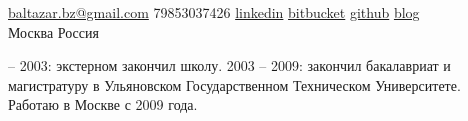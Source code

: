 \documentclass[unicode, 10pt, a4paper, oneside, fleqn]{article}
\begin{document}
\sloppy  %


\nobreakvspace{0.3em}  %

\noindent\href{mailto:baltazar.dot.bz.at.gmail.dot.com}{baltazar.bz\mbox{}@\mbox{}gmail.com}\sbull
\textsmaller{+}79853037426\sbull
\href{http://ru.linkedin.com/pub/yuri-bochkarev/21/3a9/555}{linkedin}
\sbull
\href{https://bitbucket.org/balta2ar}{bitbucket}
\sbull
\href{https://github.org/balta2ar}{github}
\sbull
\href{http://baltazar-bz.blogspot.com/}{blog}
\\
Москва\sbull
Россия
\spacedhrule{0.9em}{-0.4em}  %


\vspace{-1.3em}  %

\begin{multicols}{2}  %
 -- 2003: экстерном закончил школу. 2003 -- 2009: закончил бакалавриат и
магистратуру в Ульяновском Государственном Техническом Университете. Работаю в
Москве с 2009 года.
\end{multicols}
\spacedhrule{0em}{-0.4em}

\end{document}
